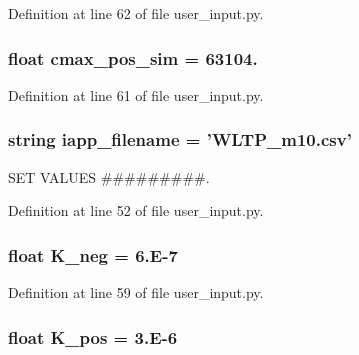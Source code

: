 Definition at line 62 of file user\-\_\-input.\-py.

\hypertarget{namespaceuser__input_aa5b015cc7d0bda453c6163023448db72}{
\subsubsection[{cmax\-\_\-pos\-\_\-sim}]{\setlength{\rightskip}{0pt plus 5cm}float cmax\-\_\-pos\-\_\-sim = 63104.}}\label{namespaceuser__input_aa5b015cc7d0bda453c6163023448db72}


Definition at line 61 of file user\-\_\-input.\-py.

\hypertarget{namespaceuser__input_af0a721bf4042ba266855bd73da684844}{
\subsubsection[{iapp\-\_\-filename}]{\setlength{\rightskip}{0pt plus 5cm}string iapp\-\_\-filename = 'W\-L\-T\-P\-\_\-m10.\-csv'}}\label{namespaceuser__input_af0a721bf4042ba266855bd73da684844}


S\-E\-T V\-A\-L\-U\-E\-S \#\#\#\#\#\#\#\#\#. 



Definition at line 52 of file user\-\_\-input.\-py.

\hypertarget{namespaceuser__input_a64d0c5854299798787675bc91586023c}{
\subsubsection[{K\-\_\-neg}]{\setlength{\rightskip}{0pt plus 5cm}float K\-\_\-neg = 6.\-E-\/7}}\label{namespaceuser__input_a64d0c5854299798787675bc91586023c}


Definition at line 59 of file user\-\_\-input.\-py.

\hypertarget{namespaceuser__input_ab1a8ebec490ba1301f818bd1c5f1f3fa}{
\subsubsection[{K\-\_\-pos}]{\setlength{\rightskip}{0pt plus 5cm}float K\-\_\-pos = 3.\-E-\/6}}\label{namespaceuser__input_ab1a8ebec490ba1301f818bd1c5f1f3fa}


